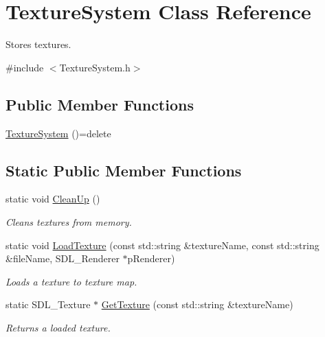 \hypertarget{class_texture_system}{}\section{Texture\+System Class Reference}
\label{class_texture_system}


Stores textures.  




{\ttfamily \#include $<$Texture\+System.\+h$>$}

\subsection*{Public Member Functions}
\begin{DoxyCompactItemize}
\item 
\mbox{\hyperlink{class_texture_system_a3d2ff8744c36cdb154a74b8f78b11f08}{Texture\+System}} ()=delete
\end{DoxyCompactItemize}
\subsection*{Static Public Member Functions}
\begin{DoxyCompactItemize}
\item 
\mbox{\label{class_texture_system_acaf3097772efaf52efeb13c622bc4740}} 
static void \mbox{\hyperlink{class_texture_system_acaf3097772efaf52efeb13c622bc4740}{Clean\+Up}} ()
\begin{DoxyCompactList}\small\item\em Cleans textures from memory. \end{DoxyCompactList}\item 
static void \mbox{\hyperlink{class_texture_system_aa771f8e2ced09436fb12fd0ebae83784}{Load\+Texture}} (const std\+::string \&texture\+Name, const std\+::string \&file\+Name, S\+D\+L\+\_\+\+Renderer $\ast$p\+Renderer)
\begin{DoxyCompactList}\small\item\em Loads a texture to texture map. \end{DoxyCompactList}\item 
static S\+D\+L\+\_\+\+Texture $\ast$ \mbox{\hyperlink{class_texture_system_a1fb557835bcd6aead8e3d03358d2363e}{Get\+Texture}} (const std\+::string \&texture\+Name)
\begin{DoxyCompactList}\small\item\em Returns a loaded texture. \end{DoxyCompactList}\end{DoxyCompactItemize}


